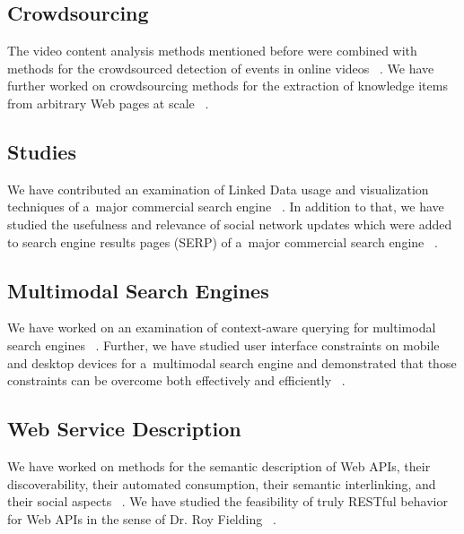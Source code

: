 \subsection{Crowdsourcing}

The video content analysis methods mentioned before
were combined with methods for the crowdsourced detection
of events in online videos~%
\cite{steiner2011crowdsourcingevent}.
We have further worked on crowdsourcing methods
for the extraction of knowledge items from arbitrary Web pages at scale~%
\cite{steiner2012sekiathome,steiner2012sekiathomechallenge}.

\subsection{Studies}

We have contributed an examination of Linked Data usage and
visualization techniques of a~major commercial search engine~%
\cite{steiner2010howgoogleisusing}.
In addition to that, we have studied the usefulness and relevance
of social network updates which were added to search engine
results pages (SERP) of a~major commercial search engine~%
\cite{steiner2012addingrealtime}.

\subsection{Multimodal Search Engines}

We have worked on an examination of context-aware querying
for multimodal search engines~%
\cite{etzold2012contextawarequerying,steiner2012isearch}.
Further, we have studied user interface constraints on
mobile and desktop devices for a~multimodal search engine
and demonstrated that those constraints can be overcome
both effectively and efficiently~%
\cite{steiner2012onesizedoesnotfitall}.

\subsection{Web Service Description}

We have worked on methods for the semantic description of Web APIs,
their discoverability, their automated consumption,
their semantic interlinking, and their social aspects~%
\cite{verborgh2011descriptionandinteraction,verborgh2011efficientruntime,verborgh2011integratingdata,verborgh2012capturingthefunctionality,verborgh2012functionalcomposition,verborgh2012functionaldescriptions,verborgh2012missinglinks,verborgh2012restdesc,verborgh2012socialdescriptionrevolution,verborgh2013semantic,verborgh2013proof,verborgh2013distributedaffordance}.
We have studied the feasibility of truly RESTful behavior
for Web APIs in the sense of Dr. Roy Fielding~%
\cite{steiner2011fulfilling}.

